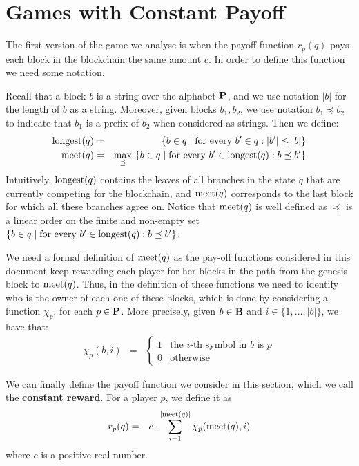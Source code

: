\section{Games with Constant Payoff}
\label{sec-constant}

The first version of the game we analyse is when the payoff function $r_p(q)$ pays each block in the blockchain the same amount $c$. In order to define this function we need 
some notation. 

Recall that a block $b$ is a string over the alphabet $\mathbf{P}$, and we use notation $|b|$ for the length of $b$ as a string. Moreover, given blocks $b_1, b_2$, we use notation $b_1 \preceq b_2$ to indicate that $b_1$ is a prefix of $b_2$  when considered as strings. Then we define: 
\begin{eqnarray*}
{\text{\rm longest}}(q) & = & \{ b \in q \mid \text{for every } b' \in q: |b'| \leq |b|\}\\
\text{\rm meet}(q) & = & {\displaystyle \max_{\preceq} \ \{b \in q \mid \text{for every } b' \in {\text{\rm longest}}(q): b \preceq b'\}}
\end{eqnarray*}
Intuitively, ${\text{\rm longest}}(q)$ contains the leaves of all branches in the state $q$ that are currently competing for the blockchain, and $\text{\rm meet}(q)$ corresponds to the last block for which all these branches agree on. Notice that $\text{\rm meet}(q)$ is well defined as $\preceq$ is a linear order on the finite and non-empty set $\{b \in q \mid \text{for every } b' \in {\text{\rm longest}}(q): b \preceq b'\}$.

We need a formal definition of $\text{\rm meet}(q)$ as the pay-off functions considered in this document keep rewarding each player for her blocks in the path from the genesis block to $\text{\rm meet}(q)$. Thus, in the definition of these functions we need to identify who is the owner of each one of these blocks, which is done by considering a function $\chi_p$, for each $p \in \mathbf{P}$. More precisely, given $b \in \mathbf{B}$ and $i \in \{1, \ldots, |b|\}$, we have that:
\begin{eqnarray*}
\chi_p(b,i) & = & 
\begin{cases}
1 & \text{the } i\text{-th symbol in } b \text{ is } p\\
0 & \text{otherwise}
\end{cases}
\end{eqnarray*}

We can finally define the payoff function we consider in this section, which we call the \textbf{constant reward}. For a player $p$, we define it as 
\begin{eqnarray*}
r_p(q) & = & 
{\displaystyle c \cdot \sum_{i=1}^{|\text{\rm meet}(q)|} \chi_p(\text{\rm meet}(q),i)} 
\end{eqnarray*}
where $c$ is a positive real number. 
 
